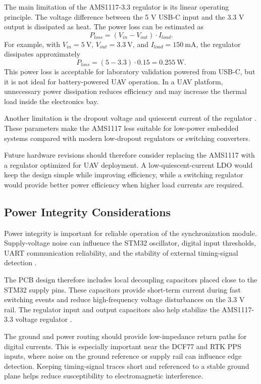 The main limitation of the AMS1117-3.3 regulator is its linear operating principle. The voltage difference between the 5 V USB-C input and the 3.3 V output is dissipated as heat. The power loss can be estimated as
\begin{equation}
P_{loss} = (V_{in} - V_{out}) \cdot I_{load}.
\end{equation}
For example, with $V_{in}=5~\mathrm{V}$, $V_{out}=3.3~\mathrm{V}$, and $I_{load}=150~\mathrm{mA}$, the regulator dissipates approximately
\begin{equation}
P_{loss} = (5 - 3.3) \cdot 0.15 = 0.255~\mathrm{W}.
\end{equation}
This power loss is acceptable for laboratory validation powered from USB-C, but it is not ideal for battery-powered UAV operation. In a UAV platform, unnecessary power dissipation reduces efficiency and may increase the thermal load inside the electronics bay.

Another limitation is the dropout voltage and quiescent current of the regulator \cite{ams1117Datasheet}. These parameters make the AMS1117 less suitable for low-power embedded systems compared with modern low-dropout regulators or switching converters.

Future hardware revisions should therefore consider replacing the AMS1117 with a regulator optimized for UAV deployment. A low-quiescent-current LDO would keep the design simple while improving efficiency, while a switching regulator would provide better power efficiency when higher load currents are required.

\subsection{Power Integrity Considerations}

Power integrity is important for reliable operation of the synchronization module. Supply-voltage noise can influence the STM32 oscillator, digital input thresholds, UART communication reliability, and the stability of external timing-signal detection \cite{kopetz2011realtime}.

The PCB design therefore includes local decoupling capacitors placed close to the STM32 supply pins. These capacitors provide short-term current during fast switching events and reduce high-frequency voltage disturbances on the 3.3 V rail. The regulator input and output capacitors also help stabilize the AMS1117-3.3 voltage regulator \cite{ams1117Datasheet}.

The ground and power routing should provide low-impedance return paths for digital currents. This is especially important near the DCF77 and RTK PPS inputs, where noise on the ground reference or supply rail can influence edge detection. Keeping timing-signal traces short and referenced to a stable ground plane helps reduce susceptibility to electromagnetic interference.

